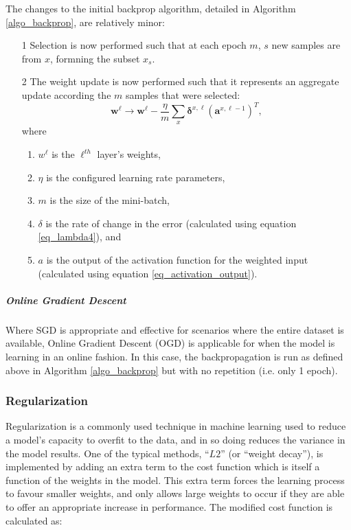 \documentclass[a4paper,11pt,oneside]{article}
\theoremstyle{plain}
\theoremstyle{definition}
\begin{document}
	The changes to the initial backprop algorithm, detailed in Algorithm \ref{algo_backprop}, are relatively minor:
	\begin{itemize}
		\item [1] Selection is now performed such that at each epoch $m$, $s$ new samples are from $x$, formning the subset $x_s$.
		\item [2] The weight update is now performed such that it represents an aggregate update according the $m$ samples that were selected:
		\begin{equation}\label{eq_backprop_weightupdate_sgd}
		\mathbf{w}^\ell \rightarrow \mathbf{w}^\ell - \frac{\eta}{m} \sum_{x} \mathbf{\delta}^{x, \ell} (\mathbf{a}^{x, \ell - 1})^T , 
		\end{equation}
		where
		\begin{enumerate}
			\item $w^\ell$ is the $\ell^{th}$ layer's weights,
			\item $\eta$ is the configured learning rate parameters, 
			\item $m$ is the size of the mini-batch,
			\item $\delta$ is the rate of change in the error (calculated using equation \eqref{eq_lambda4}), and
			\item $a$ is the output of the activation function for the weighted input (calculated using equation \eqref{eq_activation_output}).
		\end{enumerate}
	\end{itemize}
	
	\subparagraph{Online Gradient Descent}
	Where SGD is appropriate and effective for scenarios where the entire dataset is available, Online Gradient Descent (OGD) is applicable for when the model is learning in an online fashion. In this case, the backpropagation is run as defined above in Algorithm \ref{algo_backprop} but with no repetition (i.e. only 1 epoch).
	
	\subsubsection{Regularization}\label{imp_regularization}
	
	Regularization is a commonly used technique in machine learning used to reduce a model's capacity to overfit to the data, and in so doing reduces the variance in the model results. One of the typical methods, ``$L2$'' (or ``weight decay''), is implemented by adding an extra term to the cost function which is itself a function of the weights in the model. This extra term forces the learning process to favour smaller weights, and only allows large weights to occur if they are able to offer an appropriate increase in performance. The modified cost function is calculated as:
	
\end{document}
